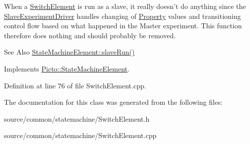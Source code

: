 When a \hyperlink{class_picto_1_1_switch_element}{Switch\-Element} is run as a slave, it really doesn't do anything since the \hyperlink{class_picto_1_1_slave_experiment_driver}{Slave\-Experiment\-Driver} handles changing of \hyperlink{class_picto_1_1_property}{Property} values and transitioning control flow based on what happened in the Master experiment. This function therefore does nothing and should probably be removed. 

\begin{DoxySeeAlso}{See Also}
\hyperlink{class_picto_1_1_state_machine_element_a0dbfefa77a60c323a285626bf6057c2b}{State\-Machine\-Element\-::slave\-Run()} 
\end{DoxySeeAlso}


Implements \hyperlink{class_picto_1_1_state_machine_element_a0dbfefa77a60c323a285626bf6057c2b}{Picto\-::\-State\-Machine\-Element}.



Definition at line 76 of file Switch\-Element.\-cpp.



The documentation for this class was generated from the following files\-:\begin{DoxyCompactItemize}
\item 
source/common/statemachine/Switch\-Element.\-h\item 
source/common/statemachine/Switch\-Element.\-cpp\end{DoxyCompactItemize}
